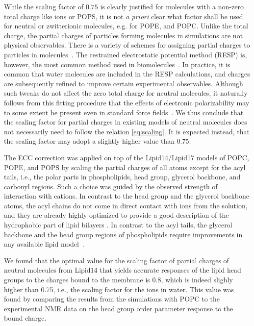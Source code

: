 While the scaling factor of $0.75$ is clearly justified for molecules with a non-zero total charge like ions or POPS,
it is not \emph{a priori} clear what factor shall be used for neutral or zwitterionic molecules, e.g. for POPE, and POPC. 
Unlike the total charge, the partial charges of particles forming molecules in simulations are not physical observables. 
There is a variety of schemes for assigning partial charges to particles in molecules~\citep{Hu2007}. 
The restrained electrostatic potential method (RESP) is, however, the most common method used in biomolecules~\citep{RESP_paper, Singh1984, dickson14}. 
In practice, it is common that water molecules are included in the RESP calculations, 
and charges are subsequently refined to improve certain experimental observables. 
Although such tweaks do not affect the zero total charge for neutral molecules,
it naturally follows from this fitting procedure that the effects of electronic polarizability 
may to some extent be present even in standard force fields~\citep{RESP_paper, Singh1984, jorgensen96, ipolq2013, benavides17}. 
We thus conclude that the scaling factor for partial charges in existing models of neutral molecules does not necessarily need to follow the relation \ref{eq:scaling}.
It is expected instead, that the scaling factor may adopt a slightly higher value than 0.75. 

The ECC correction was applied on top of the Lipid14/Lipid17 models of POPC, POPE, and POPS
by scaling the partial charges of all atoms except for the acyl tails, 
i.e., the polar parts in phospholipids, head group, glycerol backbone, and carbonyl regions. 
Such a choice was guided by the observed strength of interaction with cations. 
In contrast to the head group and the glycerol backbone atoms, 
the acyl chains do not come in direct contact with ions from the solution, 
and they are already highly optimized to provide a good description of the
hydrophobic part of lipid bilayers \cite{dickson14, ollila16, Pluhackova2016}.
In contrast to the acyl tails, the glycerol backbone and the head group regions of phospholipids 
require improvements in any available lipid model~\cite{botan15,nmrlipids_proj4}.

We found that the optimal value for the scaling factor of partial charges of neutral molecules from Lipid14 
that yields accurate responses of the lipid head groups to the charges bound to the membrane
is $0.8$, which is indeed slighly higher than 0.75, 
i.e., the scaling factor for the ions in water. 
This value was found by comparing the results from the simulations with POPC to the experimental 
NMR data on the head group order parameter response to the bound charge. \citep{akutsu81,altenbach84,scherer89}

